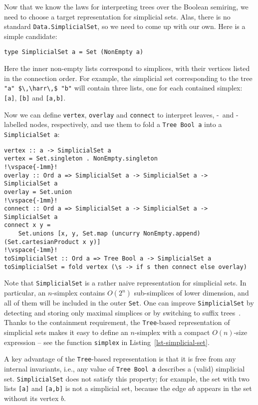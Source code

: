 \documentclass[crc,english]{programming}
\newcommand{\code}[1]{\lstinline[mathescape]|#1|}
\newcommand{\hcode}[1]{{\color{darkblue} \lstinline[keywordstyle={}]|#1|}} %
\newcommand{\harr}{\,\text{\color{darkblue} $\rightarrow$}\,}
\newcommand{\zero}{\raisebox{-0.2mm}{\textcircled{\textsf{0}}}\xspace}
\newcommand{\one}{\raisebox{-0.2mm}{\textcircled{\textsf{\hspace{-0.2mm}1}}}\xspace}
\begin{document}
\noindent
Now that we know the laws for interpreting trees over the Boolean semiring, we
need to choose a target representation for simplicial sets. Alas, there is no
standard \code{Data.SimplicialS}\code{et}, so we need to come up with our own.
Here is a simple candidate:

\begin{lstlisting}
type SimplicialSet a = Set (NonEmpty a)
\end{lstlisting}

\noindent
Here the inner non-empty lists correspond to simplices, with their vertices
listed in the connection order. For example, the simplicial set corresponding to
the tree \code{"a" $\,\harr\,$ "b"} will contain three lists, one for each
contained simplex: \code{[a]}, \code{[b]} and \code{[a,b]}.

Now we can define \hcode{vertex}, \hcode{overlay} and \hcode{connect} to
interpret leaves, \zero-~and \one-labelled nodes, respectively, and
use them to fold a \hcode{Tree Bool a} into a \hcode{SimplicialSet a}:

\begin{lstlisting}
vertex :: a -> SimplicialSet a
vertex = Set.singleton . NonEmpty.singleton
!\vspace{-1mm}!
overlay :: Ord a => SimplicialSet a -> SimplicialSet a -> SimplicialSet a
overlay = Set.union
!\vspace{-1mm}!
connect :: Ord a => SimplicialSet a -> SimplicialSet a -> SimplicialSet a
connect x y =
    Set.unions [x, y, Set.map (uncurry NonEmpty.append) (Set.cartesianProduct x y)]
!\vspace{-1mm}!
toSimplicialSet :: Ord a => Tree Bool a -> SimplicialSet a
toSimplicialSet = fold vertex (\s -> if s then connect else overlay)
\end{lstlisting}

\noindent
Note that \hcode{SimplicialSet} is a rather naive representation for simplicial
sets. In particular, an $n$-simplex contains $O(2^n)$ sub-simplices of
lower dimension, and all of them will be included in the outer \hcode{Set}. One
can improve \hcode{SimplicialSet} by detecting and storing only maximal
simplices or by switching to suffix trees~\cite{weiner_suffix_trees}. Thanks to
the containment requirement, the \hcode{Tree}-based representation of simplicial
sets makes it easy to define an $n$-simplex with a compact $O(n)$-size
expression -- see the function \hcode{simplex} in
Listing~\ref{lst-simplicial-set}.

A key advantage of the \hcode{Tree}-based representation is that it is free from
any internal invariants, i.e., any value of \hcode{Tree Bool a} describes a
(valid) simplicial set. \hcode{SimplicialSet} does not satisfy this property;
for example, the set with two lists \code{[a]} and \code{[a,b]} is not a
simplicial set, because the edge $\textit{ab}$ appears in the set without its
vertex $\textit{b}$.
\end{document}
